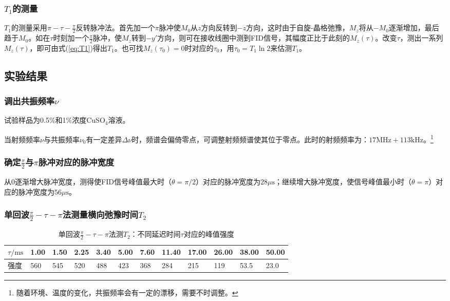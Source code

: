 \documentclass[aps,pre,12pt,preprint,onecolumn,showpacs,showkeys]{revtex4-1}
\begin{document}
        \subsubsection{$T_1$的测量}
            $T_1$的测量采用$\pi-\tau-\frac{\pi}{2}$反转脉冲法。首先加一个$\pi$脉冲使$M_0$从$z$方向反转到$-z$方向，这时由于自旋-晶格弛豫，$M_z$将从$-M_0$逐渐增加，最后趋于$M_0$。如在$\tau$时刻加一个$\frac{\pi}{2}$脉冲，使$M_z$转到$-y'$方向，则可在接收线圈中测到FID信号，其幅度正比于此刻的$M_z(\tau)$。改变$\tau$，测出一系列$M_z(\tau)$，即可由式(\ref{eq:T1})得出$T_1$。也可找$M_z(\tau_0)=0$时对应的$\tau_0$，用$\tau_0=T_1\ln 2$来估测$T_1$。



    \subsection{实验结果}
        \subsubsection{调出共振频率$\nu$}
        试验样品为0.5\%和1\%浓度CuSO$_4$溶液。

        当射频频率$\nu$与共振频率$\nu_0$有一定差异$\Delta \nu$时，频谱会偏倚零点，可调整射频频谱使其位于零点。此时的射频频率为：$17\mathrm{MHz}+113\mathrm{kHz}$。\footnote{随着环境、温度的变化，共振频率会有一定的漂移，需要不时调整。}
        \subsubsection{确定$\frac{\pi}{2}$与$\pi$脉冲对应的脉冲宽度}
            从0逐渐增大脉冲宽度，测得使FID信号峰值最大时（$\theta=\pi/2$）对应的脉冲宽度为$28\mu \mathrm{s}$；继续增大脉冲宽度，使信号峰值最小时（$\theta=\pi$）对应的脉冲宽度为$56\mu \mathrm{s}$。
        \subsubsection{单回波$\frac{\pi}{2}-\tau-\pi$法测量横向弛豫时间$T_2$}
        \begin{table}[h]
            \caption{\label{tab:danhuibo_T2}%
            单回波$\frac{\pi}{2}-\tau-\pi$法测$T_2$：不同延迟时间$\tau$对应的峰值强度}
            \begin{tabular}{|l|l|l|l|l|l|l|l|l|l|l|l|}
                \hline
                $\tau/\mathrm{ms}$&1.00&1.50&2.25&3.40&5.00&7.60&11.40&17.00&26.00&38.00&50.00\\\hline
                强度&560&545&520&488&423&368&284&215&119&53.5&23.0\\\hline
            \end{tabular}
        \end{table}
\end{document}
